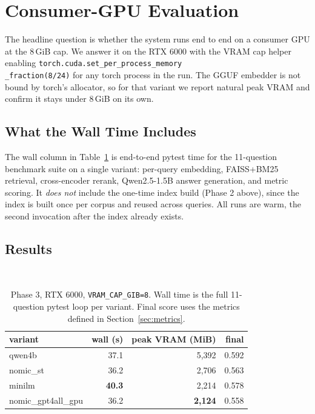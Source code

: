 \documentclass[sigconf]{acmart}
\begin{document}
\section{Consumer-GPU Evaluation}

The headline question is whether the system runs end to end on a
consumer GPU at the 8\,GiB cap. We answer it on the RTX 6000 with the
VRAM cap helper enabling
\texttt{torch.cuda.set\_per\_process\_memory}\\\texttt{\_fraction(8/24)} for any
torch process in the run. The GGUF embedder is not bound by torch's
allocator, so for that variant we report natural peak VRAM and confirm
it stays under 8\,GiB on its own.

\subsection{What the Wall Time Includes}

The wall column in Table~\ref{tab:rtx-capped} is end-to-end pytest
time for the 11-question benchmark suite on a single variant: per-query
embedding, FAISS+BM25 retrieval, cross-encoder rerank, Qwen2.5-1.5B
answer generation, and metric scoring. It \emph{does not} include the
one-time index build (Phase 2 above), since the index is built once
per corpus and reused across queries. All runs are warm, the second
invocation after the index already exists.

\subsection{Results}

\begin{table}[h]
\caption{Phase 3, RTX 6000, \texttt{VRAM\_CAP\_GIB=8}. Wall time is
the full 11-question pytest loop per variant. Final score uses the
metrics defined in Section~\ref{sec:metrics}.}
\label{tab:rtx-capped}\
\begin{tabular}{lrrr}
\toprule
variant & wall (s) & peak VRAM (MiB) & final \\
\midrule
qwen4b                       & 37.1 & 5{,}392 & 0.592 \\
nomic\_st                    & 36.2 & 2{,}706 & 0.563 \\
minilm                       & \textbf{40.3} & 2{,}214 & 0.578 \\
nomic\_gpt4all\_gpu & 36.2 & \textbf{2{,}124} & 0.558 \\
\bottomrule
\end{tabular}
\end{table}
\end{document}
